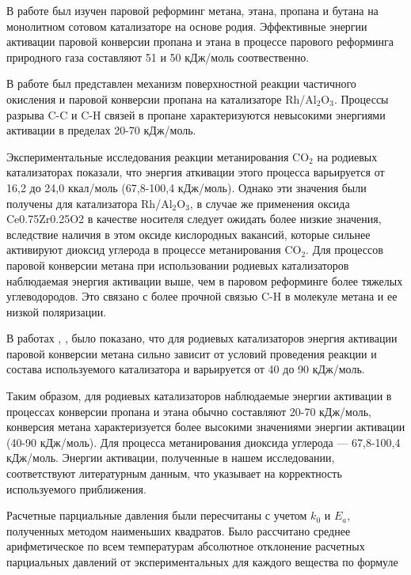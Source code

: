 \documentclass{cmi}
\begin{document}
В работе \cite{Schädel2009} был изучен паровой реформинг метана, этана, пропана и бутана на монолитном сотовом катализаторе на основе родия. Эффективные энергии активации паровой конверсии пропана и этана в процессе парового реформинга природного газа составляют 51 и 50 кДж/моль соотвественно.

В работе \cite{Karakaya2017} был представлен механизм поверхностной реакции частичного окисления и паровой конверсии пропана на катализаторе Rh/Al$_{2}$O$_{3}$. Процессы разрыва C-C и C-H связей в пропане характеризуются невысокими энергиями активации в пределах 20-70 кДж/моль.

Экспериментальные исследования реакции метанирования CO$_{2}$ на родиевых катализаторах \cite{Solymosi1981} показали, что энергия аткивации этого процесса варьируется от 16,2 до 24,0 ккал/моль (67,8-100,4 кДж/моль). Однако эти значения были получены для катализатора Rh/Al$_{2}$O$_{3}$, в случае же применения оксида Ce0.75Zr0.25O2 в качестве носителя следует ожидать более низкие значения, вследствие наличия в этом оксиде кислородных вакансий, которые сильнее активируют диоксид углерода в процессе метанирования CO$_{2}$. Для процессов паровой конверсии метана при использовании родиевых катализаторов наблюдаемая энергия активации выше, чем в паровом реформинге более тяжелых углеводородов. Это связано с более прочной связью C-H в молекуле метана и ее низкой поляризации.

В работах \cite{Schädel2009}, \cite{Zeppieri2010}, \cite{Jakobsen2010} было показано, что для родиевых катализаторов энергия активации паровой конверсии метана сильно зависит от условий проведения реакции и состава используемого катализатора и варьируется от 40 до 90 кДж/моль.

Таким образом, для родиевых катализаторов наблюдаемые энергии активации в процессах конверсии пропана и этана обычно составляют 20-70 кДж/моль, конверсия метана характеризуется более высокими значениями энергии активации (40-90 кДж/моль). Для процесса метанирования диоксида углерода --- 67,8-100,4 кДж/моль. Энергии активации, полученные в нашем исследовании, соответствуют литературным данным, что указывает на корректность используемого приближения.

Расчетные парциальные давления были пересчитаны с учетом $k_0$ и $E_a$, полученных методом наименьших квадратов. Было рассчитано среднее арифметическое по всем температурам абсолютное отклонение расчетных парциальных давлений от экспериментальных для каждого вещества по формуле
\end{document}

